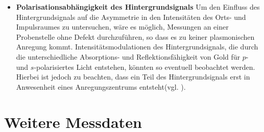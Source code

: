 \documentclass[titlepage,  ngerman]{article}
\begin{document}
\begin{itemize}
		\item \textbf{Polarisationsabhängigkeit des Hintergrundsignals} Um den Einfluss des Hintergrundsignals auf die Asymmetrie in den Intensitäten des Orts- und Impulsraumes zu untersuchen, wäre es möglich, Messungen an einer Probenstelle ohne Defekt durchzuführen, so dass es zu keiner plasmonischen Anregung kommt. Intensitätsmodulationen des Hintergrundsignals, die durch die unterschiedliche Absorptions- und Reflektionsfähigkeit von Gold für $p$- und $s$-polarisiertes Licht entstehen, könnten so eventuell beobachtet werden. Hierbei ist jedoch zu beachten, dass ein Teil des Hintergrundsignals erst in Anwesenheit eines Anregungszentrums entsteht(vgl. \cite{Drezet.2008}).
	\end{itemize}
	
	\newpage
	\appendix
	
	\newpage
	\section{Weitere Messdaten}
\end{document}
